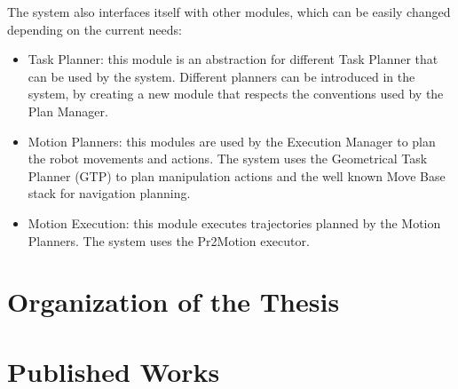 The system also interfaces itself with other modules, which can be easily changed depending on the current needs:

\begin{itemize}
\item Task Planner: this module is an abstraction for different Task Planner that can be used by the system. Different planners can be introduced in the system, by creating a new module that respects the conventions used by the Plan Manager.
\item Motion Planners:  this modules are used by the Execution Manager to plan the robot movements and actions. The system uses the Geometrical Task Planner (GTP) to plan manipulation actions and the well known Move Base stack for navigation planning. 
\item Motion Execution: this module executes trajectories planned by the Motion Planners. The system uses the Pr2Motion executor.
\end{itemize}

\section{Organization of the Thesis}

\section{Published Works}